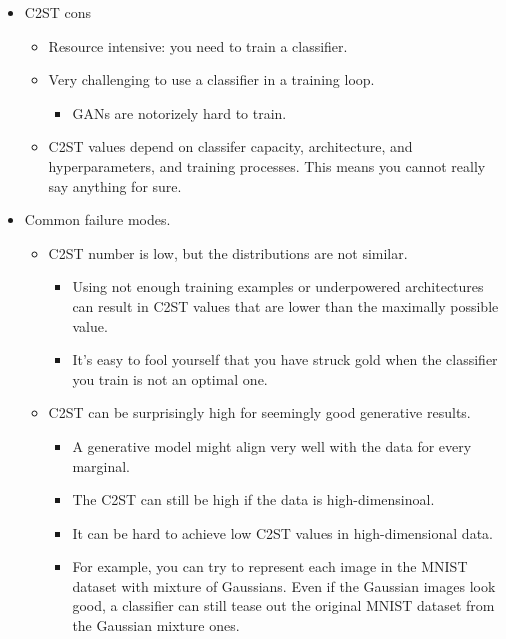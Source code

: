 \documentclass[10pt]{article}
\begin{document}
\begin{itemize}
    \item C2ST cons
    \begin{itemize}
        \item Resource intensive: you need to train a classifier.
        \item Very challenging to use a classifier in a training loop.
        \begin{itemize}
            \item GANs are notorizely hard to train.
        \end{itemize}
        \item C2ST values depend on classifer capacity, architecture, and hyperparameters, and training processes. This means you cannot really say anything for sure.
    \end{itemize}

    \item Common failure modes.
    \begin{itemize}
        \item C2ST number is low, but the distributions are not similar.
        \begin{itemize}
            \item Using not enough training examples or underpowered architectures can result in C2ST values that are lower than the maximally possible value.            
            \item It's easy to fool yourself that you have struck gold when the classifier you train is not an optimal one.
        \end{itemize}
        
        \item C2ST can be surprisingly high for seemingly good generative results.
        \begin{itemize}
            \item A generative model might align very well with the data for every marginal.
            \item The C2ST can still be high if the data is high-dimensinoal.
            \item It can be hard to achieve low C2ST values in high-dimensional data.
            \item For example, you can try to represent each image in the MNIST dataset with mixture of Gaussians. Even if the Gaussian images look good, a classifier can still tease out the original MNIST dataset from the Gaussian mixture ones.
        \end{itemize}
    \end{itemize}


\end{itemize}
\end{document}
